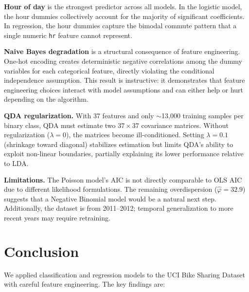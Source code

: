 \documentclass[conference]{IEEEtran}
\begin{document}
\textbf{Hour of day} is the strongest predictor across all models.
In the logistic model, the hour dummies collectively account for the majority of significant coefficients.
In regression, the hour dummies capture the bimodal commute pattern that a single numeric \texttt{hr} feature cannot represent.

\textbf{Naive Bayes degradation} is a structural consequence of feature engineering.
One-hot encoding creates deterministic negative correlations among the dummy variables for each categorical feature, directly violating the conditional independence assumption.
This result is instructive: it demonstrates that feature engineering choices interact with model assumptions and can either help or hurt depending on the algorithm.

\textbf{QDA regularization.}
With 37 features and only $\sim$13,000 training samples per binary class, QDA must estimate two $37 \times 37$ covariance matrices.
Without regularization ($\lambda = 0$), the matrices become ill-conditioned.
Setting $\lambda = 0.1$ (shrinkage toward diagonal) stabilizes estimation but limits QDA's ability to exploit non-linear boundaries, partially explaining its lower performance relative to LDA.

\textbf{Limitations.}
The Poisson model's AIC is not directly comparable to OLS AIC due to different likelihood formulations.
The remaining overdispersion ($\hat{\varphi} = 32.9$) suggests that a Negative Binomial model would be a natural next step.
Additionally, the dataset is from 2011--2012; temporal generalization to more recent years may require retraining.

\section{Conclusion}

We applied classification and regression models to the UCI Bike Sharing Dataset with careful feature engineering.
The key findings are:
\end{document}
